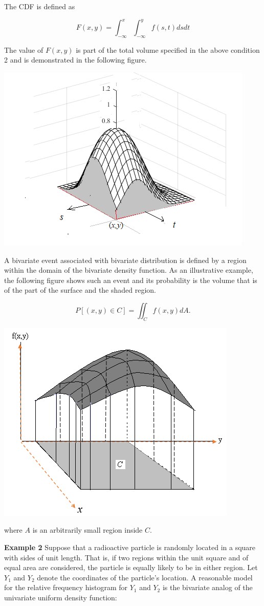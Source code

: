 \documentclass[
]{book}
\begin{document}
The CDF is defined as

\[
F(x,y) = \int_{-\infty}^x\int_{-\infty}^y f(s,t)ds dt
\]

The value of \(F(x,y)\) is part of the total volume specified in the above condition 2 and is demonstrated in the following figure.

\begin{center}\includegraphics[width=0.5\linewidth]{topic06/bivariateNormalCDF} \end{center}

A bivariate event associated with bivariate distribution is defined by a region within the domain of the bivariate density function. As an illustrative example, the following figure shows such an event and its probability is the volume that is of the part of the surface and the shaded region.

\[
P[(x,y) \in C] = \iint_C f(x,y)dA.
\]

\begin{center}\includegraphics[width=0.3\linewidth]{topic06/probOverARegionC} \end{center}

where \(A\) is an arbitrarily small region inside \(C\).

\hfill\break

\textbf{Example 2} Suppose that a radioactive particle is randomly located in a square with sides of unit length. That is, if two regions within the unit square and of equal area are considered, the particle is equally likely to be in either region. Let \(Y_1\) and \(Y_2\) denote the coordinates of the particle's location. A reasonable model for the relative frequency histogram for \(Y_1\) and \(Y_2\) is the bivariate analog of the univariate uniform density function:
\end{document}
